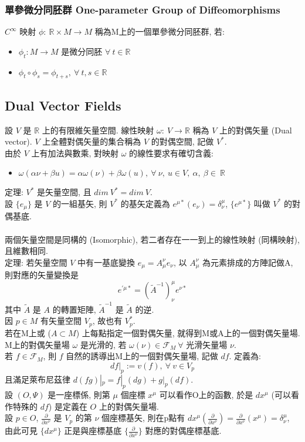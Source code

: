 \documentclass{article}
\begin{document}
\begin{CJK}{UTF8}{bsmi}
\subsubsection{單參微分同胚群 One-parameter Group of Diffeomorphisms}
$C^\infty$ 映射 $\phi:\ \mathbb{R}\times M \rightarrow M$ 稱為M上的一個單參微分同胚群, 若:\begin{itemize}
  \item $\phi_t:M\rightarrow M$ 是微分同胚 $\forall\ t \in \mathbb{R}$
  \item $\phi_t \circ \phi_s=\phi_{t+s},\ \forall\ t,s \in \mathbb{R}$
\end{itemize}
\subsection{Dual Vector Fields}
設 $V$ 是 $\mathbb{R}$ 上的有限維矢量空間. 線性映射 $\omega:\ V\rightarrow \mathbb{R}$ 稱為 $V$ 上的對偶矢量 (Dual vector). $V$ 上全體對偶矢量的集合稱為 $V$ 的對偶空間, 記做 $V^*$.
\\ 由於 $V$ 上有加法與數乘, 對映射 $\omega$ 的線性要求有確切含義:
\begin{itemize}
  \item $\omega(\alpha\nu+\beta u)=\alpha \omega (\nu)+\beta \omega(u),\ \forall\ \nu,\ u\in V,\ \alpha,\ \beta\in\
   \mathbb{R}$
\end{itemize}


定理: $V^*$ 是矢量空間, 且 $dim\ V^*=dim\ V$.
\\設 $\{ e_\mu\}$ 是 $V$ 的一組基矢, 則 $V^*$ 的基矢定義為 $e^{\mu*}(e_\nu)=\delta^\mu_\nu$, $\{ e^{\mu*}\}$ 叫做 $V^*$ 的對偶基底.\\
\\兩個矢量空間是同構的 (Isomorphic), 若二者存在一一到上的線性映射 (同構映射), 且維數相同.
\\

定理: 若矢量空間 $V$ 中有一基底變換 $e_\mu=A^\nu_\mu e_\nu$, 以 
$A^\nu_\mu$ 為元素排成的方陣記做A, 則對應的矢量變換是 
$$e^{'\mu*}=(\tilde A^{-1})_\nu^\mu e^{\nu *} $$ 其中 $\tilde A$ 是 $A$ 的轉置矩陣, 
$\tilde A^{-1}$ 是 $\tilde A$ 的逆.
\\ 因 $p\in M$ 有矢量空間 $V_p$, 故也有 $V^*_p$. \\
若在M上或 ($A\subset M$) 上每點指定一個對偶矢量, 就得到M或A上的一個對偶矢量場.\\
 M上的對偶矢量場 $\omega$ 是光滑的, 若 $\omega (\nu)\in \mathscr{F}_M\ \forall$ 光滑矢量場 $\nu$.
\\ 若 $f\in \mathscr{F}_M$, 則 $f$ 自然的誘導出M上的一個對偶矢量場, 記做 $df$. 定義為: $$df|_p:=v(f),\ \forall\ v\in V_p $$
且滿足萊布尼茲律 $d(fg)|_p=f|_p(dg)+g|_p(df)$.
\\ 設 $(O,\Psi)$ 是一座標係, 則第 $\mu$ 個座標 $x^\mu$ 可以看作O上的函數, 於是 $dx^\mu$ (可以看作特殊的 $df$) 是定義在 $O$ 上的對偶矢量場.
\\設 $p\in O$, $\frac{\partial}{\partial x^\nu}$ 是 $V_p$ 的第 $\nu$ 個座標基矢, 則在p點有 $dx^\mu(\frac{\partial}{\partial x^\nu})=\frac{\partial}{\partial x^\nu}(x^\mu)=\delta^\mu_\nu$, 由此可見 $\{ dx^\mu\}$ 正是與座標基底 $\{ \frac{\partial}{\partial x^\nu} \}$ 對應的對偶座標基底.
\\


\end{CJK}
\end{document}
